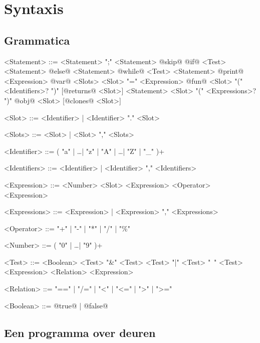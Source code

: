 \chapter{Syntaxis}

\section{Grammatica}

\begin{grammar}
<Statement>  ::= <Statement> ";" <Statement>
            \alt @skip@
            \alt @if@ <Test> <Statement> @else@ <Statement>
            \alt @while@ <Test> <Statement>
            \alt @print@ <Expression>
            \alt @var@ <Slots> 
            \alt <Slot> "=" <Expression>
            \alt @fun@ <Slot> "(" <Identifiers>? ")" [@returns@ <Slot>] <Statement>
            \alt [<Slot> "="] <Slot> "(" <Expressions>? ")"
            \alt @obj@ <Slot> [@clones@ <Slot>]

<Slot>       ::= <Identifier> | <Identifier> "." <Slot>

<Slots>       ::= <Slot> | <Slot> "," <Slots>

<Identifier> ::= ( "a" | \dots | "z" | "A" | \dots | "Z" | "_" )+

<Identifiers> ::= <Identifier> | <Identifier> "," <Identifiers>

<Expression> ::= <Number>
            \alt <Slot>
            \alt <Expression> <Operator> <Expression>

<Expressions> ::= <Expression> | <Expression> "," <Expressions>

<Operator>   ::= "+" | "-" | "*" | "/" | "\%"

<Number>     ::= ( "0" | \dots | "9" )+

<Test>       ::= <Boolean>
            \alt <Test> "\&" <Test>
            \alt <Test> "|"  <Test>
            \alt "~" <Test>
            \alt <Expression> <Relation> <Expression>

<Relation>   ::= "==" | "/=" | "<" | "<=" | ">" | ">="

<Boolean>    ::= @true@ | @false@
\end{grammar}

\section{Een programma over deuren}

